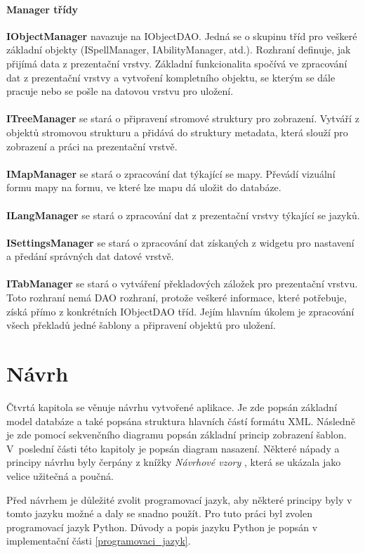 \documentclass[thesis=B,czech]{resources/FITthesis}[2012/06/26]
\begin{document}
\subsubsection*{Manager třídy}
\textbf{IObjectManager} navazuje na IObjectDAO. Jedná se o skupinu tříd pro veškeré základní objekty (ISpellManager, IAbilityManager, atd.). Rozhraní definuje, jak přijímá data z prezentační vrstvy. Základní funkcionalita spočívá ve zpracování dat z prezentační vrstvy a vytvoření kompletního objektu, se kterým se dále pracuje nebo se pošle na datovou vrstvu pro uložení.\\
\\
\noindent\textbf{ITreeManager} se stará o připravení stromové struktury pro zobrazení. Vytváří z objektů stromovou strukturu a přidává do struktury metadata, která slouží pro zobrazení a práci na prezentační vrstvě.\\
\\
\textbf{IMapManager} se stará o zpracování dat týkající se mapy. Převádí vizuální formu mapy na formu, ve které lze mapu dá uložit do databáze. \\
\\
\textbf{ILangManager} se stará o zpracování dat z prezentační vrstvy týkající se jazyků.\\
\\
\textbf{ISettingsManager} se stará o zpracování dat získaných z widgetu pro nastavení a předání správných dat datové vrstvě.\\
\\
\textbf{ITabManager} se stará o vytváření překladových záložek pro prezentační vrstvu. Toto rozhraní nemá DAO rozhraní, protože veškeré informace, které potřebuje, získá přímo z konkrétních IObjectDAO tříd. Jejím hlavním úkolem je zpracování všech překladů jedné šablony a připravení objektů pro uložení.\\





\chapter{Návrh}
Čtvrtá kapitola se věnuje návrhu vytvořené aplikace. Je zde popsán základní model databáze a také popsána struktura hlavních částí formátu XML. Následně je zde pomocí sekvenčního diagramu popsán základní princip zobrazení šablon. V~poslední části této kapitoly je popsán diagram nasazení. Některé nápady a principy návrhu byly čerpány z knížky \textit{Návrhové vzory} \cite{navrhove_vzory}, která se ukázala jako velice užitečná a poučná. \par
Před návrhem je důležité zvolit programovací jazyk, aby některé principy byly v tomto jazyku možné a daly se snadno použít. Pro tuto práci byl zvolen programovací jazyk Python. Důvody a popis jazyku Python je popsán v implementační části \ref{programovaci_jazyk}. 
\end{document}
